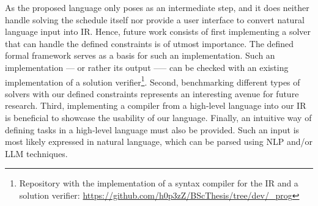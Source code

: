 As the proposed language only poses as an intermediate step, and it does neither handle solving the schedule itself nor provide a user interface to convert natural language input into \Ac{IR}. Hence, future work consists of first implementing a solver that can handle the defined constraints is of utmost importance. The defined formal framework serves as a basis for such an implementation. Such an implementation --- or rather its output --— can be checked with an existing implementation of a solution verifier\footnote{Repository with the implementation of a syntax compiler for the \Ac{IR} and a solution verifier: \url{https://github.com/h0p3zZ/BScThesis/tree/dev/_prog}}. Second, benchmarking different types of solvers with our defined constraints represents an interesting avenue for future research. Third, implementing a compiler from a high-level language into our \Ac{IR} is beneficial to showcase the usability of our language. Finally, an intuitive way of defining tasks in a high-level language must also be provided. Such an input is most likely expressed in natural language, which can be parsed using \Ac{NLP} and/or \Ac{LLM} techniques.

